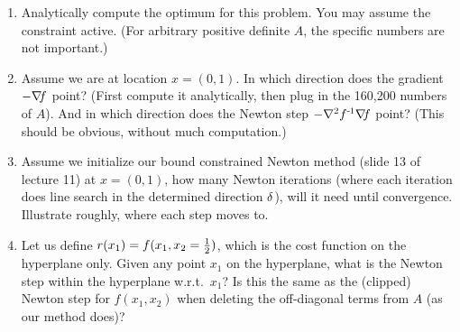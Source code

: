 
\begin{enumerate}
\item Analytically compute the optimum for this problem. You may assume the constraint active. (For arbitrary positive definite $A$, the specific numbers are not important.)

\item Assume we are at location $x=(0,1)$. In which direction does the gradient $-{\nabla_{\!\!}} f$ point? (First compute it analytically, then plug in the 160,200 numbers of $A$). And in which direction does the Newton step $-{\nabla_{\!\!}^2} f^{{\hspace*{-.0pt}\text{\rm -}\hspace*{-.5pt}}1} {\nabla_{\!\!}} f$ point? (This should be obvious, without much computation.)

\item Assume we initialize our bound constrained Newton method (slide 13 of lecture 11) at $x=(0,1)$, how many Newton iterations (where each iteration does line search in the determined direction $\delta$), will it need until convergence. Illustrate roughly, where each step moves to.

\item Let us define $r(x_1) = f(x_1, x_2=\frac{1}{2})$, which is the cost function on the hyperplane only. Given any point $x_1$ on the hyperplane, what is the Newton step within the hyperplane w.r.t.\ $x_1$? Is this the same as the (clipped) Newton step for $f(x_1,x_2)$ when deleting the off-diagonal terms from $A$ (as our method does)?
\end{enumerate}




\exerfoot

